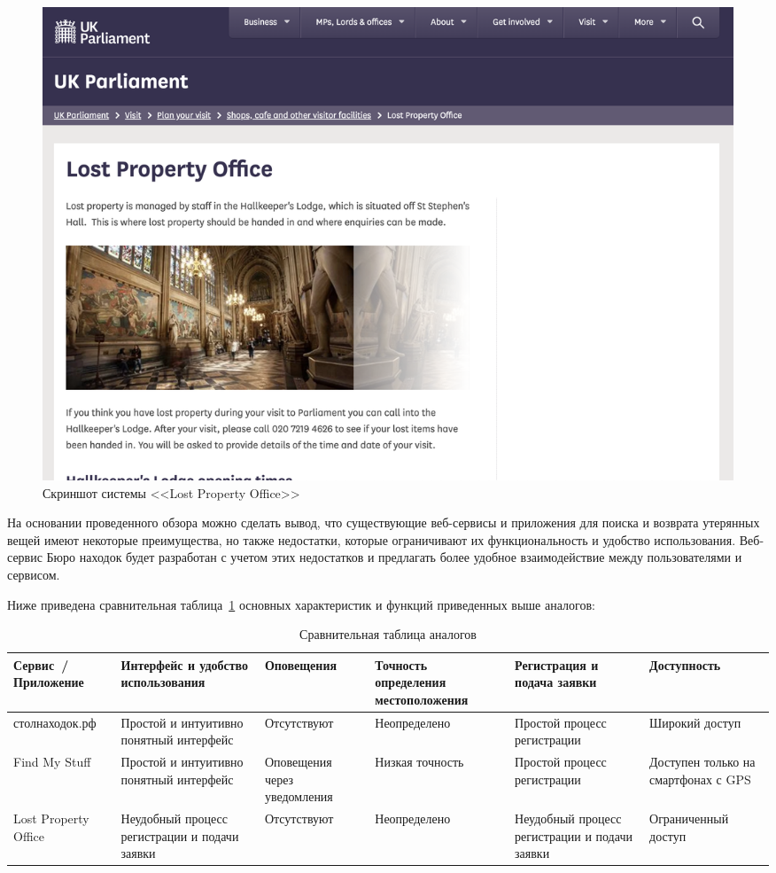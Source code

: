 \documentclass{../mirea}
\begin{document}
	\begin{figure}[htb]
		\centering
		\includegraphics[width=.95\textwidth]{../images/lostPropertyOffice}
		\parskip=6pt
		\caption{Скриншот системы <<Lost Property Office>>}
		\label{fig:lostPropertyOffice}
	\end{figure}
	
	На основании проведенного обзора можно сделать вывод, что существующие веб-сервисы и приложения для поиска и возврата утерянных вещей имеют некоторые преимущества, но также недостатки, которые ограничивают их функциональность и удобство использования. Веб-сервис Бюро находок будет разработан с учетом этих недостатков и предлагать более удобное взаимодействие между пользователями и сервисом.
	
	Ниже приведена сравнительная таблица~\ref{tab:analogs_comparison} основных характеристик и функций приведенных выше аналогов:
	\begin{table}[htb]
		\caption{Сравнительная таблица аналогов}
		\centering
		
		\emergencystretch=10pt
		\small
		\begin{tabular}{ |p{2cm}|p{3cm}|p{2cm}|p{2cm}|p{3cm}|p{2cm}| } 
			\hline
			Сервис~/ Приложение & Интерфейс и удобство использования & Опове\-ще\-ния & Точность определения местоположения & Регистрация и подача заявки & Доступ\-ность \\ \hline
			
			стол\-на\-ходок.рф & Простой и интуитивно понятный интерфейс & Отсут\-ству\-ют & Не\-оп\-ре\-де\-ле\-но & Простой процесс регистрации & Широкий доступ \\ \hline
			
			Find My Stuff & Простой и интуитивно понятный интерфейс & Опо\-ве\-ще\-ния через уведомления & Низкая точность & Простой процесс регистрации & Доступен только на смартфонах с GPS \\ \hline
			
			Lost Property Office & Неудобный процесс регистрации и подачи заявки & Отсут\-ству\-ют & Не\-оп\-ре\-де\-ле\-но & Неудобный процесс регистрации и подачи заявки & Огра\-ни\-чен\-ный доступ \\ \hline
		\end{tabular}
		\label{tab:analogs_comparison}
	\end{table}
	
\end{document}
